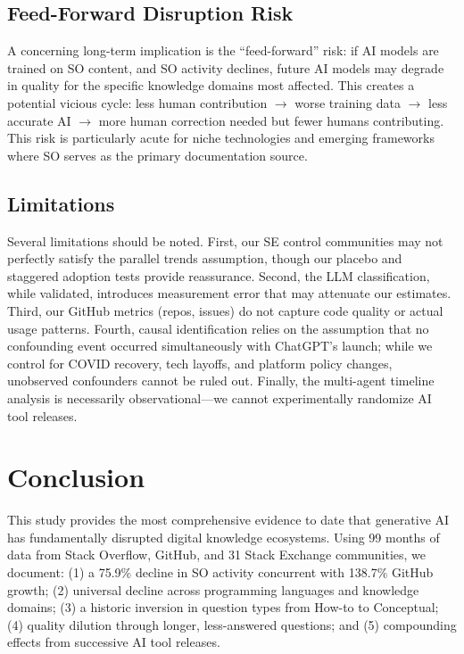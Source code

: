 \documentclass[11pt,a4paper]{article}
\begin{document}
\subsection{Feed-Forward Disruption Risk}

A concerning long-term implication is the ``feed-forward'' risk: if AI models are trained on SO content, and SO activity declines, future AI models may degrade in quality for the specific knowledge domains most affected. This creates a potential vicious cycle: less human contribution $\rightarrow$ worse training data $\rightarrow$ less accurate AI $\rightarrow$ more human correction needed but fewer humans contributing. This risk is particularly acute for niche technologies and emerging frameworks where SO serves as the primary documentation source.

\subsection{Limitations}

Several limitations should be noted. First, our SE control communities may not perfectly satisfy the parallel trends assumption, though our placebo and staggered adoption tests provide reassurance. Second, the LLM classification, while validated, introduces measurement error that may attenuate our estimates. Third, our GitHub metrics (repos, issues) do not capture code quality or actual usage patterns. Fourth, causal identification relies on the assumption that no confounding event occurred simultaneously with ChatGPT's launch; while we control for COVID recovery, tech layoffs, and platform policy changes, unobserved confounders cannot be ruled out. Finally, the multi-agent timeline analysis is necessarily observational---we cannot experimentally randomize AI tool releases.

\section{Conclusion}
\label{sec:conclusion}

This study provides the most comprehensive evidence to date that generative AI has fundamentally disrupted digital knowledge ecosystems. Using 99 months of data from Stack Overflow, GitHub, and 31 Stack Exchange communities, we document: (1) a 75.9\% decline in SO activity concurrent with 138.7\% GitHub growth; (2) universal decline across programming languages and knowledge domains; (3) a historic inversion in question types from How-to to Conceptual; (4) quality dilution through longer, less-answered questions; and (5) compounding effects from successive AI tool releases.
\end{document}
